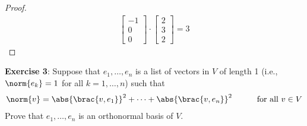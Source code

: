 \documentclass{article}
\begin{document}
\begin{proof}
	\begin{align*}
		\begin{bmatrix} -1 \\ 0 \\ 0 \end{bmatrix} \cdot \begin{bmatrix} 2 \\ 3 \\ 2 \end{bmatrix} = 3
	\end{align*}
\end{proof}
\textbf{Exercise 3}: Suppose that $e_{1}, \ldots, e_{n}$ is a list of vectors in $V$ of length 1 (i.e., $\norm{e_{k}} = 1$ for all $k = 1, \ldots, n$) such that
\begin{align*}
	\norm{v} = \abs{\brac{v, e_{1}}}^{2} + \cdots + \abs{\brac{v, e_{n}}}^{2} \hspace{30pt} \text{for all $v \in V$}
\end{align*}
Prove that $e_{1}, \ldots, e_{n}$ is an orthonormal basis of $V$.
\end{document}
